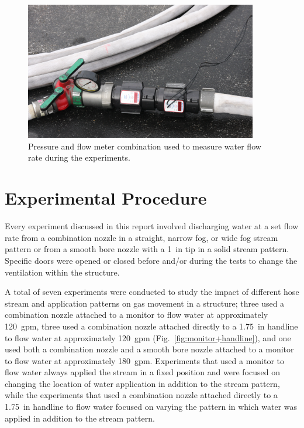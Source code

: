 \documentclass[12pt,oneside]{book}
\begin{document}
\begin{figure}[!ht]
	\includegraphics[width=4in]{../Figures/Pictures/flow_meter}
	\caption[Flow meter used to measure flow rate during experiments.]{Pressure and flow meter combination used to measure water flow rate during the experiments.}
	\label{fig:flow_meter}
\end{figure}
\FloatBarrier

\section{Experimental Procedure}
\label{sec:exp_procedure}
Every experiment discussed in this report involved discharging water at a set flow rate from a combination nozzle in a straight, narrow fog, or wide fog stream pattern or from a smooth bore nozzle with a 1~in tip in a solid stream pattern. Specific doors were opened or closed before and/or during the tests to change the ventilation within the structure. 

A total of seven experiments were conducted to study the impact of different hose stream and application patterns on gas movement in a structure; three used a combination nozzle attached to a monitor to flow water at approximately 120~gpm, three used a combination nozzle attached directly to a 1.75~in handline to flow water at approximately 120~gpm (Fig.~\ref{fig:monitor+handline}), and one used both a combination nozzle and a smooth bore nozzle attached to a monitor to flow water at approximately 180~gpm. Experiments that used a monitor to flow water always applied the stream in a fixed position and were focused on changing the location of water application in addition to the stream pattern, while the experiments that used a combination nozzle attached directly to a 1.75~in handline to flow water focused on varying the pattern in which water was applied in addition to the stream pattern.
\end{document}

